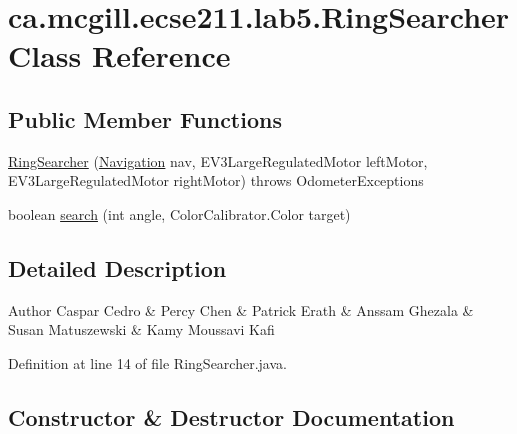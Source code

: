 \hypertarget{classca_1_1mcgill_1_1ecse211_1_1lab5_1_1_ring_searcher}{}\section{ca.\+mcgill.\+ecse211.\+lab5.\+Ring\+Searcher Class Reference}
\label{classca_1_1mcgill_1_1ecse211_1_1lab5_1_1_ring_searcher}
\subsection*{Public Member Functions}
\begin{DoxyCompactItemize}
\item 
\hyperlink{classca_1_1mcgill_1_1ecse211_1_1lab5_1_1_ring_searcher_aa3f2d76984b3b80f32b6ddd6770e24b0}{Ring\+Searcher} (\hyperlink{classca_1_1mcgill_1_1ecse211_1_1lab5_1_1_navigation}{Navigation} nav, E\+V3\+Large\+Regulated\+Motor left\+Motor, E\+V3\+Large\+Regulated\+Motor right\+Motor)  throws Odometer\+Exceptions 
\item 
boolean \hyperlink{classca_1_1mcgill_1_1ecse211_1_1lab5_1_1_ring_searcher_a88a4c77f3c76d74edc8bfd0229f0902f}{search} (int angle, Color\+Calibrator.\+Color target)
\end{DoxyCompactItemize}


\subsection{Detailed Description}
\begin{DoxyAuthor}{Author}
Caspar Cedro \& Percy Chen \& Patrick Erath \& Anssam Ghezala \& Susan Matuszewski \& Kamy Moussavi Kafi 
\end{DoxyAuthor}


Definition at line 14 of file Ring\+Searcher.\+java.



\subsection{Constructor \& Destructor Documentation}
\mbox{\label{classca_1_1mcgill_1_1ecse211_1_1lab5_1_1_ring_searcher_aa3f2d76984b3b80f32b6ddd6770e24b0}} 
